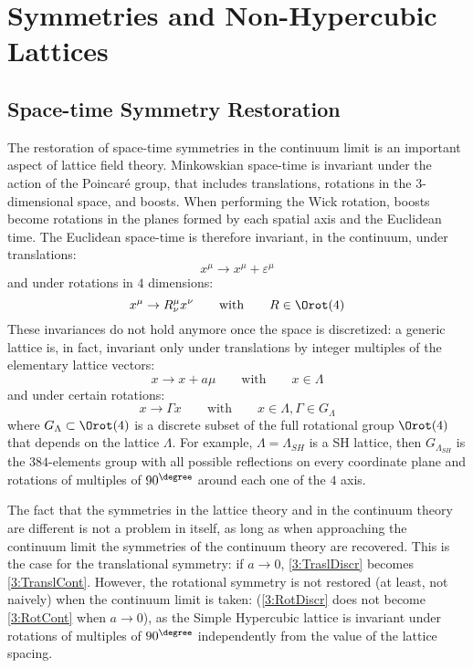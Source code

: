 \pagestyle{myFancy}
\chapter{Symmetries and Non-Hypercubic Lattices\label{Chap:F4Lattice}}

\section{Space-time Symmetry Restoration}
The restoration of space-time symmetries in the continuum limit is an important aspect of lattice field theory.
Minkowskian space-time is invariant under the action of the Poincaré group, that includes translations, rotations in the $3$-dimensional space, and boosts.
When performing the Wick rotation, boosts become rotations in the planes formed by each spatial axis and the Euclidean time.
The Euclidean space-time is therefore invariant, in the continuum, under translations:
\begin{equation}
    x^\mu \to x^\mu + \varepsilon^\mu \label{3:TranslCont}
\end{equation}
and under rotations in $4$ dimensions:
\begin{equation}
    x^\mu \to R^\mu_\nu x^\nu \qquad\text{with}\qquad R\in\Orot(4) \label{3:RotCont}
\end{equation}
These invariances do not hold anymore once the space is discretized: a generic lattice is, in fact, invariant only under translations by integer multiples of the elementary lattice vectors:
\begin{equation}
    x \to x + a\mu \qquad\text{with}\qquad x\in\Lambda \label{3:TraslDiscr}
\end{equation}
and under certain rotations:
\begin{equation}
    x \to \Gamma x \qquad\text{with}\qquad x\in\Lambda, \Gamma\in G_\Lambda \label{3:RotDiscr}
\end{equation}
where $G_\Lambda\subset\Orot(4)$ is a discrete subset of the full rotational group $\Orot(4)$ that depends on the lattice $\Lambda$.
For example, $\Lambda=\Lambda_{SH}$ is a SH lattice, then $G_{\Lambda_{SH}}$ is the $384$-elements group with all possible reflections on every coordinate plane and rotations of multiples of $90^\degree$ around each one of the $4$ axis.

The fact that the symmetries in the lattice theory and in the continuum theory are different is not a problem in itself, as long as when approaching the continuum limit the symmetries of the continuum theory are recovered.
This is the case for the translational symmetry: if $a\to0$, \eqref{3:TraslDiscr} becomes \eqref{3:TranslCont}.
However, the rotational symmetry is not restored (at least, not naively) when the continuum limit is taken: (\eqref{3:RotDiscr} does not become \eqref{3:RotCont} when $a\to0$), as the Simple Hypercubic lattice is invariant under rotations of multiples of $90^\degree$ independently from the value of the lattice spacing.

